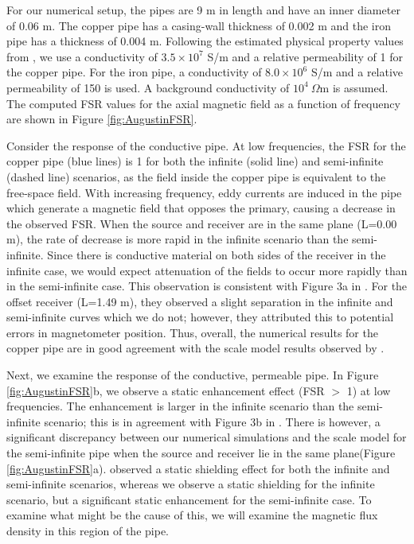For our numerical setup, the pipes are 9 m in length and have an inner diameter of 0.06 m. The copper pipe has a casing-wall thickness of 0.002 m and the iron pipe has a thickness of 0.004 m. Following the estimated physical property values from \cite{Augustin1989}, we use a conductivity of $3.5 \times 10^7$ S/m and a relative permeability of 1 for the copper pipe. For the iron pipe, a conductivity of $8.0 \times 10^6$ S/m and a relative permeability of 150 is used. A background conductivity of $10^4 ~\Omega$m is assumed. The computed FSR values for the axial magnetic field as a function of frequency are shown in Figure \ref{fig:AugustinFSR}.




Consider the response of the conductive pipe. At low frequencies, the FSR for the copper pipe (blue lines) is 1 for both the infinite (solid line) and semi-infinite (dashed line) scenarios, as the field inside the copper pipe is equivalent to the free-space field. With increasing frequency, eddy currents are induced in the pipe which generate a magnetic field that opposes the primary, causing a decrease in the observed FSR. When the source and receiver are in the same plane (L=0.00 m), the rate of decrease is more rapid in the infinite scenario than the semi-infinite. Since there is conductive material on both sides of the receiver in the infinite case, we would expect attenuation of the fields to occur more rapidly than in the semi-infinite case. This observation is consistent with Figure 3a in \cite{Augustin1989}. For the offset receiver (L=1.49 m), they observed a slight separation in the infinite and semi-infinite curves which we do not; however, they attributed this to potential errors in magnetometer position. Thus, overall, the numerical results for the copper pipe are in good agreement with the scale model results observed by \cite{Augustin1989}.

Next, we examine the response of the conductive, permeable pipe. In Figure \ref{fig:AugustinFSR}b, we observe a static enhancement effect (FSR $>$ 1) at low frequencies. The enhancement is larger in the infinite scenario than the semi-infinite scenario; this is in agreement with Figure 3b in \cite{Augustin1989}. There is however, a significant discrepancy between our numerical simulations and the scale model for the semi-infinite pipe when the source and receiver lie in the same plane(Figure \ref{fig:AugustinFSR}a). \cite{Augustin1989} observed a static shielding effect for both the infinite and semi-infinite scenarios, whereas we observe a static shielding for the infinite scenario, but a significant static enhancement for the semi-infinite case. To examine what might be the cause of this, we will examine the magnetic flux density in this region of the pipe.

